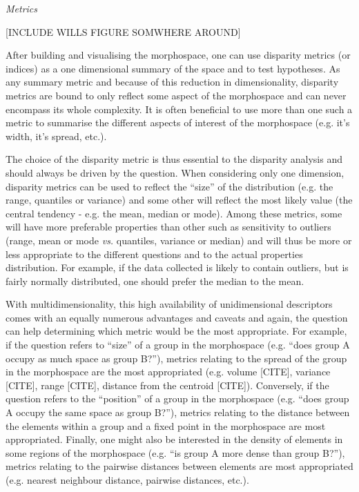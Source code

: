 \documentclass[12pt,letterpaper]{article}
\renewcommand{\subsection}[1]{%
\bigskip
\begin{center}
\begin{large}
\normalfont\itshape #1
\end{large}
\end{center}}
\begin{document}
\subsection{Metrics}
\label{metrics}
 
[INCLUDE WILLS FIGURE SOMWHERE AROUND]



After building and visualising the morphospace, one can use disparity metrics (or indices) as a one dimensional summary of the space and to test hypotheses.
As any summary metric and because of this reduction in dimensionality, disparity metrics are bound to only reflect some aspect of the morphospace and can never encompass its whole complexity.
It is often beneficial to use more than one such a metric to summarise the different aspects of interest of the morphospace (e.g. it's width, it's spread, etc.).

The choice of the disparity metric is thus essential to the disparity analysis and should always be driven by the question.
When considering only one dimension, disparity metrics can be used to reflect the ``size'' of the distribution (e.g. the range, quantiles or variance) and some other will reflect the most likely value (the central tendency - e.g. the mean, median or mode).
Among these metrics, some will have more preferable properties than other such as sensitivity to outliers (range, mean or mode \textit{vs.} quantiles, variance or median) and will thus be more or less appropriate to the different questions and to the actual properties distribution.
For example, if the data collected is likely to contain outliers, but is fairly normally distributed, one should prefer the median to the mean.

With multidimensionality, this high availability of unidimensional descriptors comes with an equally numerous advantages and caveats and again, the question can help determining which metric would be the most appropriate.
For example, if the question refers to ``size'' of a group in the morphospace (e.g. ``does group A occupy as much space as group B?''), metrics relating to the spread of the group in the morphospace are the most appropriated (e.g. volume [CITE], variance [CITE], range [CITE], distance from the centroid [CITE]).
Conversely, if the question refers to the ``position'' of a group in the morphospace (e.g. ``does group A occupy the same space as group B?''), metrics relating to the distance between the elements within a group and a fixed point in the morphospace are most appropriated.
Finally, one might also be interested in the density of elements in some regions of the morphospace (e.g. ``is group A more dense than group B?''), metrics relating to the pairwise distances between elements are most appropriated (e.g. nearest neighbour distance, pairwise distances, etc.).
\end{document}
